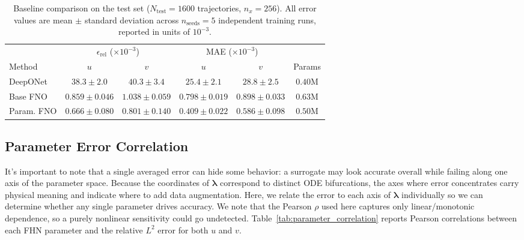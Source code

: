 \documentclass[runningheads]{llncs}
\begin{document}
\begin{table}[!ht]
\begin{center}
\begin{scriptsize}
\begin{sc}
\setlength{\tabcolsep}{5pt}
\begin{tabular}{lccccc}
\toprule
 & \multicolumn{2}{c}{$\epsilon_{\text{rel}}$ ($\times 10^{-3}$)} & \multicolumn{2}{c}{MAE ($\times 10^{-3}$)} & \\
\cmidrule(lr){2-3} \cmidrule(lr){4-5}
Method & $u$ & $v$ & $u$ & $v$ & Params \\
\midrule
DeepONet
  & $38.3 \pm 2.0$ & $40.3 \pm 3.4$
  & $25.4 \pm 2.1$ & $28.8 \pm 2.5$
  & $0.40$M \\
Base FNO
  & $0.859 \pm 0.046$ & $1.038 \pm 0.059$
  & $0.798 \pm 0.019$ & $0.898 \pm 0.033$
  & $0.63$M \\
Param. FNO
  & $\bm{0.666 \pm 0.080}$ & $\bm{0.801 \pm 0.140}$
  & $\bm{0.409 \pm 0.022}$ & $\bm{0.586 \pm 0.098}$
  & $0.50$M \\
\bottomrule
\end{tabular}
\end{sc}
\end{scriptsize}
\end{center}
\smallskip
\caption{Baseline comparison on the test set ($N_{\text{test}} = 1600$
trajectories, $n_x = 256$). All error values are mean $\pm$ standard deviation
across $n_{\text{seeds}} = 5$ independent training runs, reported in units of
$10^{-3}$. }
\label{tab:baselines}
\end{table}


\subsection{Parameter Error Correlation}
\label{sec:parameter_generalization}


It's important to note that a single averaged error can hide some behavior: a surrogate may look accurate overall while failing along one axis of the parameter space. Because the coordinates of $\bm{\lambda}$ correspond to distinct ODE bifurcations, the axes where error concentrates carry physical meaning and indicate where to add data augmentation. Here, we relate the error to each axis of $\bm{\lambda}$ individually so we can determine whether any single parameter drives accuracy. We note that the Pearson $\rho$ used here captures only linear/monotonic dependence, so a purely nonlinear sensitivity could go undetected. Table~\ref{tab:parameter_correlation} reports Pearson correlations between each FHN parameter and the relative $L^2$ error for both $u$ and $v$.
\end{document}
